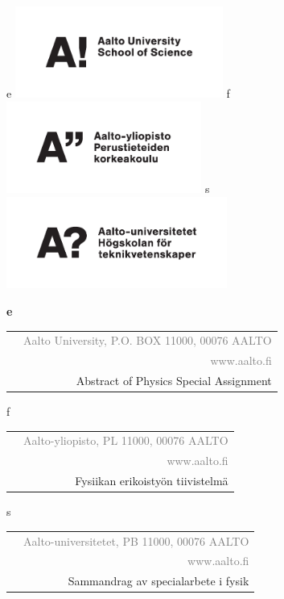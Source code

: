 
{\sffamily

\noindent
\if\mylang e
\includegraphics[height=30mm]{Aalto_SCI_EN}
\fi
\if\mylang f
\includegraphics[height=30mm]{Aalto_SCI_FI}
\fi
\if\mylang s
\includegraphics[height=30mm]{Aalto_SCI_SE}
\fi

\vspace*{-21mm}

{\small
{\bfseries
\if\mylang e
\begin{tabular*}{105mm}{lr}
\multicolumn{1}{l}{\mbox{}\hspace{65mm}\mbox{}}
& \textcolor{gray}{Aalto University, P.O. BOX 11000, 00076 AALTO} \\
& \textcolor{gray}{www.aalto.fi} \\
& Abstract of Physics Special Assignment \\
\end{tabular*}
\fi
\if\mylang f
\begin{tabular*}{105mm}{lr}
\multicolumn{1}{l}{\mbox{}\hspace{80mm}\mbox{}}
& \textcolor{gray}{Aalto-yliopisto, PL 11000, 00076 AALTO} \\
& \textcolor{gray}{www.aalto.fi} \\
& Fysiikan erikoistyön tiivistelmä \\
\end{tabular*}
\fi
\if\mylang s
\begin{tabular*}{105mm}{lr}
\multicolumn{1}{l}{\mbox{}\hspace{70mm}\mbox{}}
& \textcolor{gray}{Aalto-universitetet, PB 11000, 00076 AALTO} \\
& \textcolor{gray}{www.aalto.fi} \\
& Sammandrag av specialarbete i fysik \\
\end{tabular*}
\fi
}
}

}
